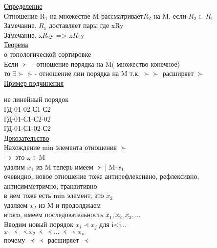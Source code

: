 \documentclass{article}
\begin{document}
\underline{Определение}\\
Отношение R$_1$ на множестве M рассматривает$R_2$ на M, если $R_2 \subset R_1$\\
Замечание. $R_1$ доставляет пары где xRy\\
Замечание. x$R_2$y => x$R_1$y\\
\underline{Теорема}\\
о топологической сортировке\\
Если $\succ$ - отношение порядка на M( множество конечное)\\
то $\exists \succ \succ$- отношение лин порядка на M т.к. $\succ \succ$ расширяет $\succ$\\
\underline{Пример подчинения}\\
 не линейный порядок\\
ГД-01-02-С1-С2\\
ГД-01-С1-С2-02\\
ГД-01-С1-02-С2\\
\underline{Докозательство}\\
Нахождение min элемента отношения $\succ$\\
$\supset$ это x$\in $M\\
удалим $x_1$ из M теперь имеем $\succ$| M-{$x_1$}\\
очевидно, новое отношение тоже антирефлексивно, рефлексивно, антисимметрично, транзитивно\\
в нем тоже есть min элемент, это $x_2$\\
удаляем $x_2$ из М и продолджаем\\
итого, имеем последовательность $x_1,x_2,x_3,...$\\
Вводим новый порядок $x_i \prec x_j$ для i<j...\\
$x_1 \prec \prec x_2 \prec \prec... \prec \prec x_n$\\
почему $\prec \prec$ расширяет $\prec$\\
\end{document}
